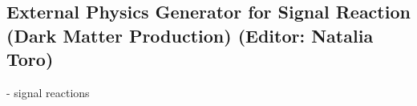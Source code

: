 
\subsection{External Physics Generator for Signal Reaction (Dark Matter Production) (Editor: Natalia Toro)}
- signal reactions
